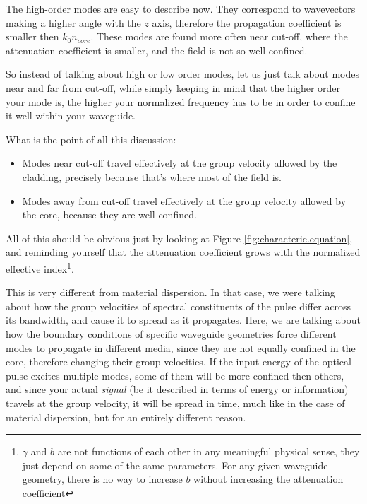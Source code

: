 The high-order modes are easy to describe now. They correspond to wavevectors making a higher angle with the $z$ axis, therefore the propagation coefficient is smaller then $k_0n_{core}$. These modes are found more often near cut-off, where the attenuation coefficient is smaller, and the field is not so well-confined.

So instead of talking about high or low order modes, let us just talk about modes near and far from cut-off, while simply keeping in mind that the higher order your mode is, the higher your normalized frequency has to be in order to confine it well within your waveguide.

What is the point of all this discussion: 
\begin{itemize}
    \item Modes near cut-off travel effectively at the group velocity allowed by the cladding, precisely because that's where most of the field is.
    \item Modes away from cut-off travel effectively at the group velocity allowed by the core, because they are well confined.
\end{itemize}

All of this should be obvious just by looking at Figure \ref{fig:characteric.equation}, and reminding yourself that the attenuation coefficient grows with the normalized effective index\footnote{$\gamma$ and $b$ are not functions of each other in any meaningful physical sense, they just depend on some of the same parameters. For any given waveguide geometry, there is no way to increase $b$ without increasing the attenuation coefficient}. 

This is very different from material dispersion. In that case, we were talking about how the group velocities of spectral constituents of the pulse differ across its bandwidth, and cause it to spread as it propagates. Here, we are talking about how the boundary conditions of specific waveguide geometries force different modes to propagate in different media, since they are not equally confined in the core, therefore changing their group velocities. If the input energy of the optical pulse excites multiple modes, some of them will be more confined then others, and since your actual \textit{signal} (be it described in terms of energy or information) travels at the group velocity, it will be spread in time, much like in the case of material dispersion, but for an entirely different reason.

